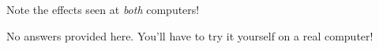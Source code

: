 \vskip 10pt

Note the effects seen at {\it both} computers!








No answers provided here.  You'll have to try it yourself on a real computer!











